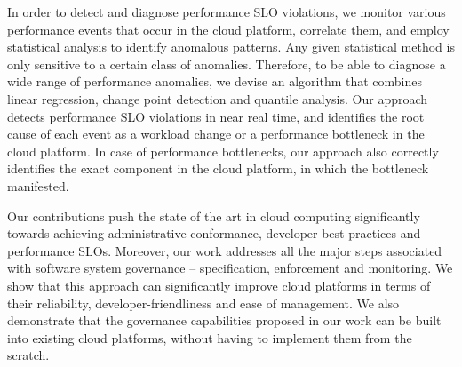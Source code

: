 In order to detect and diagnose performance SLO violations,
we monitor various performance events that occur in the cloud platform,
correlate them, and employ statistical analysis to identify anomalous patterns. Any given statistical
method is only sensitive to a certain class of anomalies. Therefore, to be able to diagnose a wide range of
performance anomalies, we devise an algorithm that combines linear regression, change point
detection and quantile analysis. Our approach detects performance SLO violations in near real time,
and identifies the root cause of each event as a workload change or a performance bottleneck
in the cloud platform. In case of performance bottlenecks, our approach also correctly identifies
the exact component in the cloud platform, in which the bottleneck manifested.

Our contributions push the state of the art in cloud computing significantly towards achieving
administrative conformance, developer best practices and performance SLOs. Moreover,
our work addresses all the major steps associated with software system governance --
specification, enforcement and monitoring. We show that this approach can significantly improve cloud platforms
in terms of their reliability, developer-friendliness and ease of management. We also demonstrate
that the governance capabilities proposed in our work can be built into existing cloud platforms,
without having to implement them from the scratch.